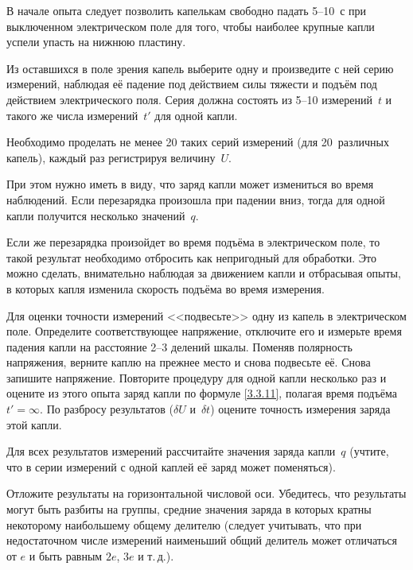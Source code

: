 \begin{lab:task}
\item В начале опыта следует позволить капелькам свободно падать 5--10~с 
при выключенном электрическом поле для того, чтобы наиболее крупные
капли успели упасть на нижнюю пластину.

Из оставшихся в поле зрения капель выберите одну и произведите с ней серию
измерений, наблюдая её падение под действием силы тяжести и подъём под действием
электрического поля. Серия должна состоять из 5--10 измерений~$t$ и такого
же числа измерений~$t'$ для одной капли.

\item Необходимо проделать не менее 20 таких серий измерений (для 20~различных
капель), каждый раз регистрируя величину~$U$. 

При этом нужно иметь в виду, что заряд капли может измениться во время наблюдений.
Если перезарядка произошла при падении вниз, тогда для одной
капли получится несколько значений~$q$.

Если же перезарядка произойдет во время подъёма в электрическом поле,
то такой результат необходимо отбросить как непригодный для обработки. 
Это можно сделать, внимательно наблюдая за движением капли и отбрасывая опыты, 
в которых капля изменила скорость подъёма во время измерения.

\item Для оценки точности измерений <<подвесьте>> одну из капель в электрическом
поле. Определите соответствующее напряжение, отключите его  и измерьте время
падения капли на расстояние 2--3 делений шкалы. Поменяв полярность
напряжения, верните каплю на прежнее место и снова подвесьте её. Снова запишите
напряжение. Повторите  процедуру  для одной капли несколько раз и 
оцените из этого опыта заряд капли по формуле \eqref{3.3.11}, полагая время
подъёма $t'=\infty$. 
По разбросу результатов ($\delta U$ и~$\delta t$) оцените
точность измерения заряда этой капли.


\item Для всех результатов измерений рассчитайте значения заряда капли~$q$
(учтите, что в серии измерений с одной каплей её заряд может поменяться).

\item Отложите результаты на горизонтальной числовой оси. Убедитесь, что
результаты могут быть разбиты на группы, средние значения заряда в которых
кратны некоторому наибольшему общему делителю
(следует учитывать, что при недостаточном числе измерений 
наименьший общий делитель может отличаться от $e$ и быть равным $2e$, $3e$ и т.\,д.).


\end{lab:task}

